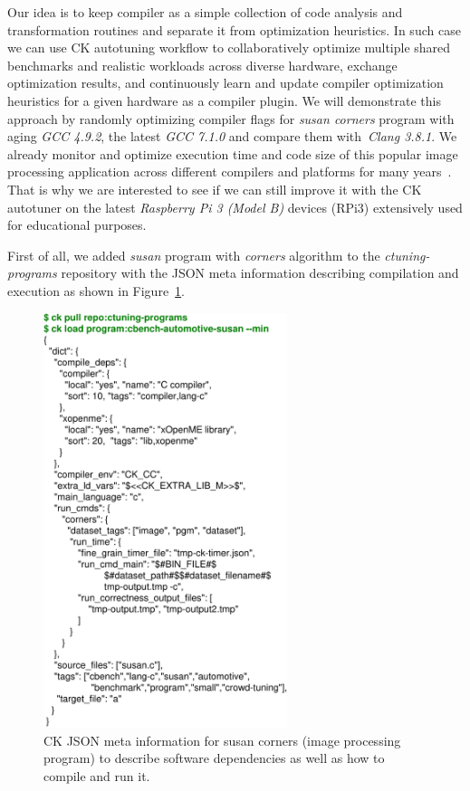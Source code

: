 Our idea is to keep compiler as a simple collection of code analysis and transformation routines 
and separate it from optimization heuristics.
%
In such case we can use CK autotuning workflow to collaboratively optimize multiple 
shared benchmarks and realistic workloads across diverse hardware, exchange optimization results,
and continuously learn and update compiler optimization heuristics for a given hardware 
as a compiler plugin.
%
We will demonstrate this approach by randomly optimizing compiler flags 
for \textit{susan corners} program with aging \textit{GCC 4.9.2}, the latest \textit{GCC 7.1.0}
and compare them with~\textit{Clang 3.8.1}.
%
We already monitor and optimize execution time and code size of this popular image processing 
application across different compilers and platforms for many years~\cite{29db2248aba45e59:a31e374796869125}.
%
That is why we are interested to see if we can still improve it with the CK autotuner 
on the latest \textit{Raspberry Pi 3 (Model B)} devices (RPi3) extensively used for educational purposes.

First of all, we added \textit{susan} program with \textit{corners} algorithm 
to the \textit{ctuning-programs} repository with the JSON meta information 
describing compilation and execution 
as shown in Figure~\ref{fig:susan-corners-ck-json-meta}.

   \begin{figure}[]
     \centering
      \includegraphics[width=2.8in]
      {ck-assets/354165ad6dde5667-cropped.pdf} %
     \caption{
       CK JSON meta information for susan corners (image processing program) to describe software dependencies as well as how to compile and run it.
     }
     \label{fig:susan-corners-ck-json-meta}
   \end{figure}

